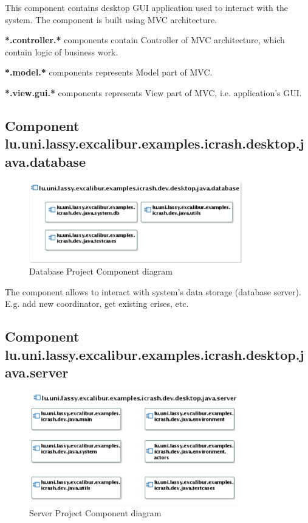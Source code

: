 This component contains desktop GUI application used to interact with the
system. The component is built using MVC architecture.

\textbf{*.controller.*} components contain Controller of MVC architecture, which
contain logic of business work.

\textbf{*.model.*} components represents Model part of MVC.

\textbf{*.view.gui.*} components represents View part of MVC, i.e. application's
GUI.

\subsection{Component lu.uni.lassy.excalibur.examples.icrash.desktop.java.database}
\begin{figure}[H]
\begin{center}
  \includegraphics[width=350px]{images/architecture/implementation-view/database_project.eps}
  \caption{Database Project Component diagram}
  \label{database_project_comp_diag}
\end{center}
\end{figure}

The component allows to interact with system's data storage (database server).
E.g. add new coordinator, get existing crises, etc. 


\subsection{Component lu.uni.lassy.excalibur.examples.icrash.desktop.java.server}
\begin{figure}[H]
\begin{center}
  \includegraphics[width=350px]{images/architecture/implementation-view/server_project.eps}
  \caption{Server Project Component diagram}
  \label{server_project_comp_diag}
\end{center}
\end{figure}

